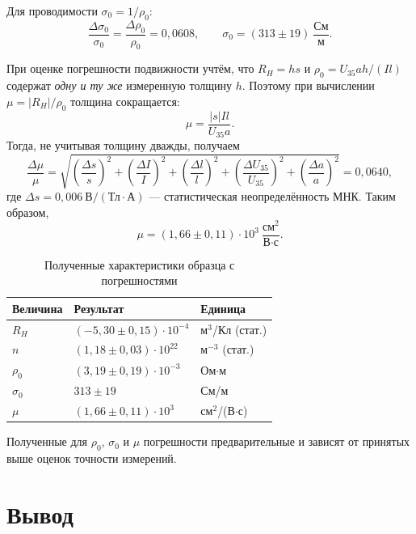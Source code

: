\documentclass[12pt,a4paper]{article}
\begin{document}
Для проводимости $\sigma_0=1/\rho_0$:
\begin{equation}
 \frac{\Delta\sigma_0}{\sigma_0}
 =\frac{\Delta\rho_0}{\rho_0}
 =0{,}0608,
 \qquad
 \sigma_0=(313\pm19)\ \frac{\text{См}}{\text{м}}.
\end{equation}

При оценке погрешности подвижности учтём, что
$R_H=hs$ и $\rho_0=U_{35}ah/(Il)$ содержат
\emph{одну и ту же} измеренную толщину $h$.
Поэтому при вычислении $\mu=|R_H|/\rho_0$
толщина сокращается:
\begin{equation}
 \mu=\frac{|s|Il}{U_{35}a}.
\end{equation}
Тогда, не учитывая толщину дважды, получаем
\begin{equation}
 \frac{\Delta\mu}{\mu}=
 \sqrt{
 \left(\frac{\Delta s}{s}\right)^2+
 \left(\frac{\Delta I}{I}\right)^2+
 \left(\frac{\Delta l}{l}\right)^2+
 \left(\frac{\Delta U_{35}}{U_{35}}\right)^2+
 \left(\frac{\Delta a}{a}\right)^2
 }
 =0{,}0640,
\end{equation}
где $\Delta s=0{,}006\ \text{В}/(\text{Тл}\cdot\text{А})$
--- статистическая неопределённость МНК.
Таким образом,
\begin{equation}
 \mu=(1{,}66\pm0{,}11)\cdot10^3\
       \frac{\text{см}^2}{\text{В}\cdot\text{с}}.
\end{equation}

\begin{table}[H]
\centering
\caption{Полученные характеристики образца с погрешностями}
\label{tab:summary}
\begin{tabular}{@{}lll@{}}
\toprule
Величина & Результат & Единица \\
\midrule
$R_H$ & $(-5{,}30\pm0{,}15)\cdot10^{-4}$ &
м$^3$/Кл (стат.) \\
$n$ & $(1{,}18\pm0{,}03)\cdot10^{22}$ &
м$^{-3}$ (стат.) \\
$\rho_0$ & $(3{,}19\pm0{,}19)\cdot10^{-3}$ & Ом$\cdot$м \\
$\sigma_0$ & $313\pm19$ & См/м \\
$\mu$ & $(1{,}66\pm0{,}11)\cdot10^3$ &
см$^2$/(В$\cdot$с) \\
\bottomrule
\end{tabular}
\end{table}
Полученные для $\rho_0$, $\sigma_0$ и $\mu$ погрешности
предварительные и зависят от принятых выше оценок
точности измерений.

\section*{Вывод}
\end{document}
